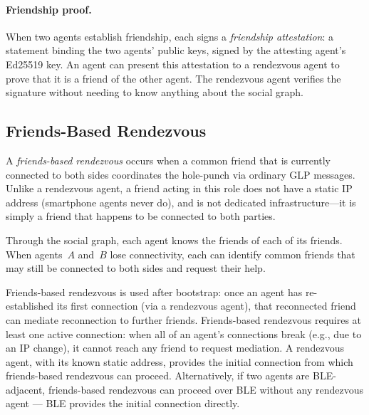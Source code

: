     
\paragraph{Friendship proof.}
\label{sec:friendship-proof}
When two agents establish friendship, each signs a \emph{friendship attestation}: a statement binding the two agents' public keys, signed by the attesting agent's Ed25519 key.  An agent can present this attestation to a rendezvous agent to prove that it is a friend of the other agent.  The rendezvous agent verifies the signature without needing to know anything about the social graph.

\subsection{Friends-Based Rendezvous}
\label{sec:friends-based-rv}
A \emph{friends-based rendezvous} occurs when a common friend that is currently connected to both sides coordinates the hole-punch via ordinary GLP messages.  Unlike a rendezvous agent, a friend acting in this role does not have a static IP address (smartphone agents never do), and is not dedicated infrastructure---it is simply a friend that happens to be connected to both parties.

Through the social graph, each agent knows the friends of each of its friends.  When agents~$A$ and~$B$ lose connectivity, each can identify common friends that may still be connected to both sides and request their help.

Friends-based rendezvous is used after bootstrap: once an agent has re-established its first connection (via a rendezvous agent), that reconnected friend can mediate reconnection to further friends.  Friends-based rendezvous requires at least one active connection: when all of an agent's connections break (e.g., due to an IP change), it cannot reach any friend to request mediation.  A rendezvous agent, with its known static address, provides the initial connection from which friends-based rendezvous can proceed.  Alternatively, if two agents are BLE-adjacent, friends-based rendezvous can proceed over BLE without any rendezvous agent --- BLE provides the initial connection directly.


